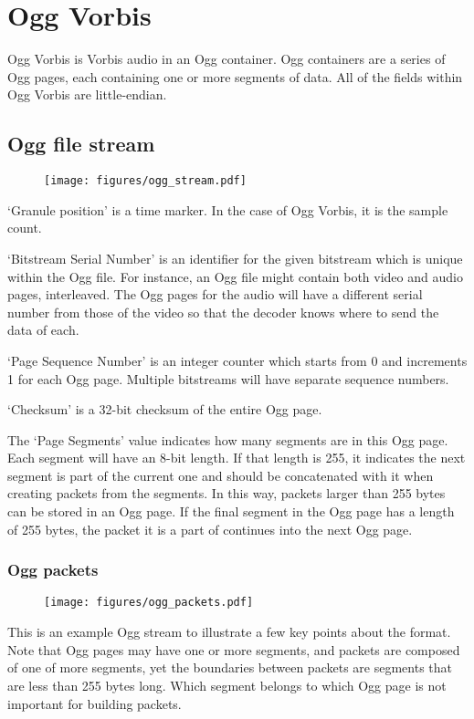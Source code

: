 \chapter{Ogg Vorbis}
\label{vorbis}
Ogg Vorbis is Vorbis audio in an Ogg container.
Ogg containers are a series of Ogg pages, each containing
one or more segments of data.
All of the fields within Ogg Vorbis are little-endian.
\section{Ogg file stream}
\begin{figure}[h]
\texttt{[image: figures/ogg\_stream.pdf]}
\end{figure}
`Granule position' is a time marker.
In the case of Ogg Vorbis, it is the sample count.

`Bitstream Serial Number' is an identifier for the given
bitstream which is unique within the Ogg file.
For instance, an Ogg file might contain both video and
audio pages, interleaved.
The Ogg pages for the audio will have a different
serial number from those of the video so that the decoder
knows where to send the data of each.

`Page Sequence Number' is an integer counter which starts from 0
and increments 1 for each Ogg page.
Multiple bitstreams will have separate sequence numbers.

`Checksum' is a 32-bit checksum of the entire Ogg page.

The `Page Segments' value indicates how many segments are in
this Ogg page.
Each segment will have an 8-bit length.
If that length is 255, it indicates the next segment is
part of the current one and should be concatenated with it when
creating packets from the segments.
In this way, packets larger than 255 bytes can be stored in
an Ogg page.
If the final segment in the Ogg page has a length of 255 bytes,
the packet it is a part of continues into the next Ogg page.

\subsection{Ogg packets}
\begin{figure}[h]
\texttt{[image: figures/ogg\_packets.pdf]}
\end{figure}
\par
\noindent
This is an example Ogg stream to illustrate a few key points about
the format.
Note that Ogg pages may have one or more segments,
and packets are composed of one of more segments,
yet the boundaries between packets are segments
that are less than 255 bytes long.
Which segment belongs to which Ogg page is not important
for building packets.

